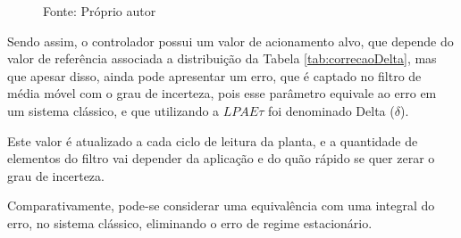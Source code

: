 \begin{figure}[!h]
\label{fig:diagramaBlocosLPAEtDelta}

{\vspace{0.2cm} \small Fonte: Próprio autor}
\end{figure}



Sendo assim, o controlador possui um valor de acionamento alvo,
que depende do valor de referência associada a distribuição
da Tabela \ref{tab:correcaoDelta},
mas que apesar disso, ainda pode apresentar um erro,
que é captado no filtro de média móvel com o grau de incerteza,
pois esse parâmetro equivale ao erro em um sistema clássico,
e que utilizando a $LPAE\tau$ foi denominado Delta ($\delta$).

Este valor é atualizado a cada ciclo de leitura da planta,
e a quantidade de elementos do filtro vai depender da aplicação e
do quão rápido se quer zerar o grau de incerteza.

Comparativamente, pode-se considerar uma equivalência com uma
integral do erro, no sistema clássico,
eliminando o erro de regime estacionário. 

